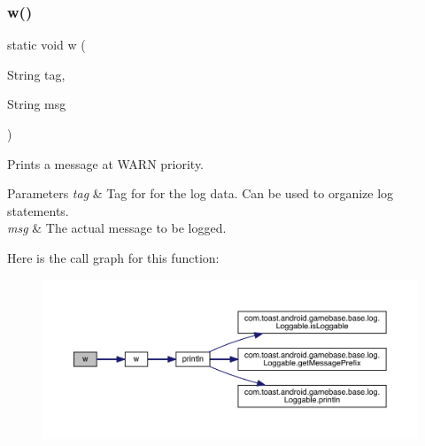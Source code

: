 \subsubsection{\texorpdfstring{w()}{w()}\hspace{0.1cm}{\footnotesize\ttfamily [2/3]}}
{\footnotesize\ttfamily static void w (\begin{DoxyParamCaption}\item[{String}]{tag,  }\item[{String}]{msg }\end{DoxyParamCaption})\hspace{0.3cm}{\ttfamily [static]}}



Prints a message at W\+A\+RN priority. 


\begin{DoxyParams}{Parameters}
{\em tag} & Tag for for the log data. Can be used to organize log statements. \\
\hline
{\em msg} & The actual message to be logged. \\
\hline
\end{DoxyParams}
Here is the call graph for this function\+:
\nopagebreak
\begin{figure}[H]
\begin{center}
\leavevmode
\includegraphics[width=350pt]{classcom_1_1toast_1_1android_1_1gamebase_1_1base_1_1log_1_1_logger_a514df8f7e3381ecc0c9dabf76723b688_cgraph}
\end{center}
\end{figure}
\mbox{\label{classcom_1_1toast_1_1android_1_1gamebase_1_1base_1_1log_1_1_logger_aea8dff5a52edecf3597b8f086e941790}} 
